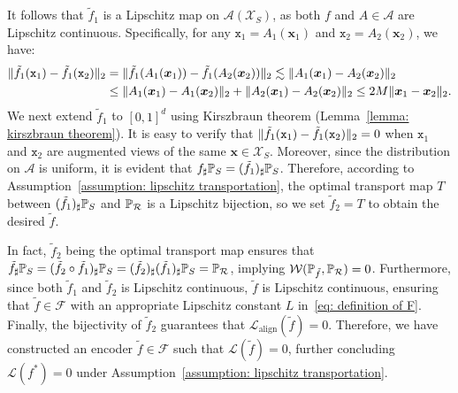 It follows that $\tilde{f}_1$ is a Lipschitz map on $\mathcal{A}(\mathcal{X}_S)$, as both $f$ and $A \in \mathcal{A}$ are Lipschitz continuous. Specifically, for any $\mathtt{x}_1 = A_1(\bm{x}_1)$ and $\mathtt{x}_2 = A_2(\bm{x}_2)$, we have:
\begin{align*}
    \norm{\tilde{f}_1(\mathtt{x}_1) - \tilde{f}_1(\mathtt{x}_2)}_2 &=
    \norm{\tilde{f}_1(A_1(\bm{x}_1)) - \tilde{f}_1(A_2(\bm{x}_2))}_2 \lesssim \norm{A_1(\bm{x}_1) - A_2(\bm{x}_2)}_2\\
    &\leq \norm{A_1(\bm{x}_1) - A_1(\bm{x}_2)}_2 + \norm{A_2(\bm{x}_1) - A_2(\bm{x}_2)}_2 \leq 2M\norm{\bm{x}_1 - \bm{x}_2}_2.
\end{align*}
We next extend $\tilde{f}_1$ to $[0,1]^d$ using Kirszbraun theorem (Lemma~\ref{lemma: kirszbraun theorem}). It is easy to verify that $\norm{\tilde{f}_1(\mathtt{x}_1) - \tilde{f}_1(\mathtt{x}_2)}_2 = 0$ when $\mathtt{x}_1$ and $\mathtt{x}_2$ are augmented views of the same $\bm{x} \in \mathcal{X}_S$. Moreover, since the distribution on $\mathcal{A}$ is uniform, it is evident that $f_\sharp\P_S = (\tilde{f}_1)_\sharp\P_S$. Therefore, according to Assumption~\ref{assumption: lipschitz transportation}, the optimal transport map $T$ between $(\tilde{f}_1)_\sharp\P_S$ and $\P_\mathcal{R}$ is a Lipschitz bijection, so we set $\tilde{f}_2 = T$ to obtain the desired $\tilde{f}$.

In fact, $\tilde{f}_2$ being the optimal transport map ensures that $\tilde{f}_\sharp\P_S = (\tilde{f}_2\circ \tilde{f_1})_\sharp\P_S = (\tilde{f}_2)_\sharp (\tilde{f}_1)_\sharp\P_S= \P_\mathcal{R}$, implying $\mathcal{W}(\P_{\tilde{f}}, \P_\mathcal{R}) = 0$. Furthermore, since both $\tilde{f}_1$ and $\tilde{f}_2$ is Lipschitz continuous, $\tilde{f}$ is Lipschitz continuous, ensuring that $\tilde{f} \in \mathcal{F}$ with an appropriate Lipschitz constant $L$ in~\eqref{eq: definition of F}. Finally, the bijectivity of $\tilde{f}_2$ guarantees that $\mathcal{L}_{\mathrm{align}}(\tilde{f})= 0$. Therefore, we have constructed an encoder $\tilde{f} \in \mathcal{F}$ such that $\mathcal{L}(\tilde{f}) = 0$, further concluding $\mathcal{L}(f^*)=0$ under Assumption~\ref{assumption: lipschitz transportation}.

